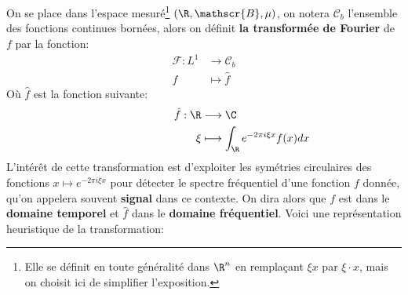 \chapter*{} %
On se place dans l'espace mesuré\footnote[1]{Elle se définit en toute généralité dans \( \R^n \) en remplaçant \( \xi x \) par \( \xi \cdot x \), mais on choisit ici de simplifier l'exposition.} \( (\R, \mathscr{B}, \mu) \), on notera \( \mathcal{C}_b \) l'ensemble des fonctions continues bornées, alors on définit \textbf{la transformée de Fourier} de \( f \) par la fonction:
\[ 
   \begin{aligned}
      \mathcal{F} : L^1 &\longrightarrow \mathcal{C}_b \\
      f &\longmapsto \hat{f}
   \end{aligned}
\]
Où \( \hat{f} \) est la fonction suivante:
\[ 
   \quad\quad\quad\quad\quad\quad\quad\begin{aligned}
      \hat{f} : \R &\longrightarrow \C \\
      \xi &\longmapsto \int_{ \R} e^{-2\pi i\xi x} f(x)dx
   \end{aligned}
\]
L'intérêt de cette transformation est d'exploiter les symétries circulaires des fonctions \(x \mapsto e^{-2\pi i\xi x} \) pour détecter le spectre fréquentiel d'une fonction \( f \) donnée, qu'on appelera souvent \textbf{signal} dans ce contexte. On dira alors que \( f \) est dans le \textbf{domaine temporel} et \( \hat{f} \) dans le \textbf{domaine fréquentiel}. Voici une représentation heuristique de la transformation:

